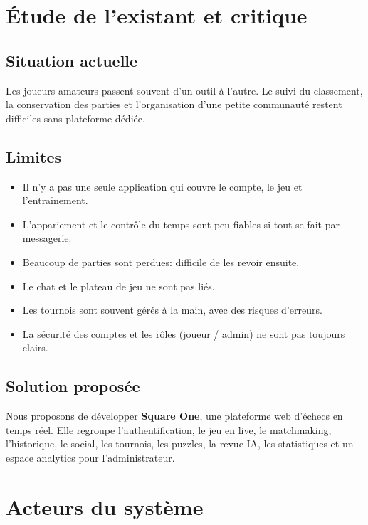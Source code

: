 \documentclass[12pt,a4paper,oneside]{article}
\begin{document}
\section{Étude de l'existant et critique}

\subsection{Situation actuelle}
Les joueurs amateurs passent souvent d'un outil à l'autre.
Le suivi du classement, la conservation des parties et l'organisation d'une petite communauté restent difficiles sans plateforme dédiée.

\subsection{Limites}
\begin{itemize}
  \item Il n'y a pas une seule application qui couvre le compte, le jeu et l'entraînement.
  \item L'appariement et le contrôle du temps sont peu fiables si tout se fait par messagerie.
  \item Beaucoup de parties sont perdues: difficile de les revoir ensuite.
  \item Le chat et le plateau de jeu ne sont pas liés.
  \item Les tournois sont souvent gérés à la main, avec des risques d'erreurs.
  \item La sécurité des comptes et les rôles (joueur / admin) ne sont pas toujours clairs.
\end{itemize}

\subsection{Solution proposée}
Nous proposons de développer \textbf{Square One}, une plateforme web d'échecs en temps réel.
Elle regroupe l'authentification, le jeu en live, le matchmaking, l'historique, le social, les tournois, les puzzles, la revue IA, les statistiques et un espace analytics pour l'administrateur.

\section{Acteurs du système}
\end{document}
